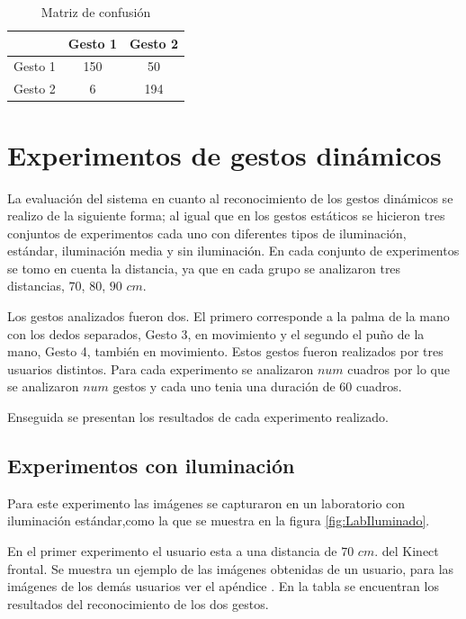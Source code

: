 \begin{table}[h!] 
\begin{center}
\begin{tabular}{ r || c | c |} 
 
        & Gesto 1 & Gesto 2 \\ \hline \hline  
Gesto 1 & 150     &  50     \\ \hline  
Gesto 2 & 6      &  194     \\   

\end{tabular}
\end{center} 
\caption{Matriz de confusión}
\end{table}




\section{Experimentos de gestos dinámicos}\label{TestDinamicGestures} 

La evaluación del sistema en cuanto al reconocimiento de los gestos dinámicos se realizo de la siguiente forma; al igual que en los gestos estáticos se hicieron tres conjuntos de experimentos cada uno con diferentes tipos de iluminación, estándar, iluminación media y sin iluminación. En cada conjunto de experimentos se tomo en cuenta la distancia, ya que en cada grupo se analizaron tres distancias, $70$, $80$, $90$ $cm$. 

Los gestos analizados fueron dos. El primero corresponde a la palma de la mano con los dedos separados, Gesto 3, en movimiento y el segundo el puño de la mano, Gesto 4, también en movimiento. Estos gestos fueron realizados por tres usuarios distintos. Para cada experimento se analizaron $num$ cuadros por lo que se analizaron $num$ gestos y cada uno tenia una duración de $60$ cuadros.  

Enseguida se presentan los resultados de cada experimento realizado. 

\subsection{Experimentos con iluminación} 
Para este experimento las imágenes se capturaron en un laboratorio con iluminación estándar,como la que se muestra en la figura \ref{fig:LabIluminado}.

En el primer experimento el usuario esta a una distancia de $70$ $cm.$ del Kinect frontal. Se muestra un ejemplo de las imágenes obtenidas de un usuario, para las imágenes de los demás usuarios ver el apéndice . En la tabla se encuentran los resultados del reconocimiento de los dos gestos.  

